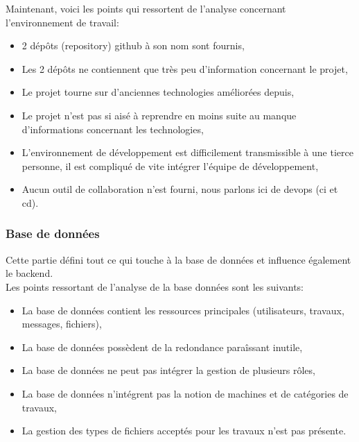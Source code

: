 \documentclass[
    iai, %
    il, %
]{heig-tb}
\begin{document}
Maintenant, voici les points qui ressortent de l'analyse concernant l'environnement de travail:
\begin{itemize}
    \item 2 dépôts (repository) \Gls{github} à son nom sont fournis,
    \item Les 2 dépôts ne contiennent que très peu d'information concernant le projet,
    \item Le projet tourne sur d'anciennes technologies améliorées depuis,
    \item Le projet n'est pas si aisé à reprendre en moins suite au manque d'informations concernant les technologies,
    \item L'environnement de développement est difficilement transmissible à une tierce personne, il est compliqué de vite intégrer l'équipe de développement,
    \item Aucun outil de collaboration n'est fourni, nous parlons ici de \Gls{devops} (\Gls{ci} et \Gls{cd}).
\end{itemize}

\subsubsection{Base de données}
Cette partie défini tout ce qui touche à la base de données et influence également le \Gls{backend}.\\
Les points ressortant de l'analyse de la base données sont les suivants:
\begin{itemize}
    \item La base de données contient les ressources principales (utilisateurs, travaux, messages, fichiers),
    \item La base de données possèdent de la redondance paraîssant inutile,
    \item La base de données ne peut pas intégrer la gestion de plusieurs rôles,
    \item La base de données n'intégrent pas la notion de machines et de catégories de travaux,
    \item La gestion des types de fichiers acceptés pour les travaux n'est pas présente.
\end{itemize}
\end{document}
